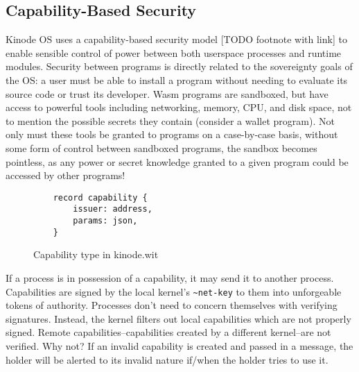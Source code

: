 \documentclass[runningheads]{llncs}
\begin{document}
\subsection{Capability-Based Security}

Kinode OS uses a capability-based security model [TODO footnote with link] to enable sensible control of power between both userspace processes and runtime modules.
Security between programs is directly related to the sovereignty goals of the OS: a user must be able to install a program without needing to evaluate its source code or trust its developer.
Wasm programs are sandboxed, but have access to powerful tools including networking, memory, CPU, and disk space, not to mention the possible secrets they contain (consider a wallet program).
Not only must these tools be granted to programs on a case-by-case basis, without some form of control between sandboxed programs, the sandbox becomes pointless, as any power or secret knowledge granted to a given program could be accessed by other programs!

\begin{figure}
    \centering
    \begin{lstlisting}
    record capability {
        issuer: address,
        params: json,
    }
    \end{lstlisting}
    \caption{Capability type in kinode.wit}
    \label{fig:WIT Types 3}
\end{figure}

If a process is in possession of a capability, it may send it to another process.
Capabilities are signed by the local kernel's \verb|~net-key| to  them into unforgeable tokens of authority.
Processes don't need to concern themselves with verifying signatures.
Instead, the kernel filters out local capabilities which are not properly signed.
Remote capabilities–capabilities created by a different kernel–are not verified.
Why not?
If an invalid capability is created and passed in a message, the holder will be alerted to its invalid nature if/when the holder tries to use it.
\end{document}
